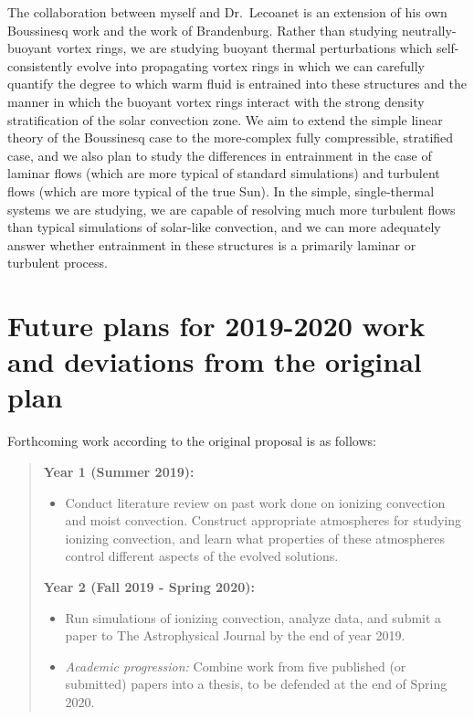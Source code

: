 \documentclass[aasms,12pt]{article}
\begin{document}
The collaboration between myself and Dr.~Lecoanet is an extension of his own Boussinesq work
and the work of Brandenburg. Rather than studying neutrally-buoyant vortex rings, we are studying
buoyant thermal perturbations which self-consistently evolve into propagating vortex rings
in which we can carefully quantify the degree to which warm fluid is entrained into these
structures and the manner in which the buoyant vortex rings interact with the strong
density stratification of the solar convection zone. We aim to extend the simple linear theory
of the Boussinesq case to the more-complex fully compressible, stratified case, and we also
plan to study the differences in entrainment in the case of laminar flows (which are more
typical of standard simulations) and turbulent flows (which are more typical of the true
Sun). In the simple, single-thermal systems we are studying, we are capable of resolving
much more turbulent flows than typical simulations of solar-like convection, and we can more
adequately answer whether entrainment in these structures is a primarily laminar or turbulent
process.

\section{Future plans for 2019-2020 work and deviations from the original plan}
\label{sec:future_plans}
Forthcoming work according to the original proposal is as follows:

\begin{quote}
\textbf{Year 1 (Summer 2019):}
\begin{itemize}
\item Conduct literature review on past work done on ionizing convection and moist convection.
Construct appropriate atmospheres for studying ionizing convection, and learn what properties of
these atmospheres control different aspects of the evolved solutions.
\end{itemize}

\vspace{-0.2cm}
\noindent
\textbf{Year 2 (Fall 2019 - Spring 2020):}
\begin{itemize}
\vspace{-0.2cm}
\item Run simulations of ionizing convection, analyze data, and submit a paper to The
Astrophysical Journal by the end of year 2019.
\vspace{-0.2cm}
\item \emph{Academic progression:} Combine work from five published (or submitted) papers into a thesis, to be defended at the end of 
Spring 2020.
\end{itemize}
\end{quote}
\end{document}
